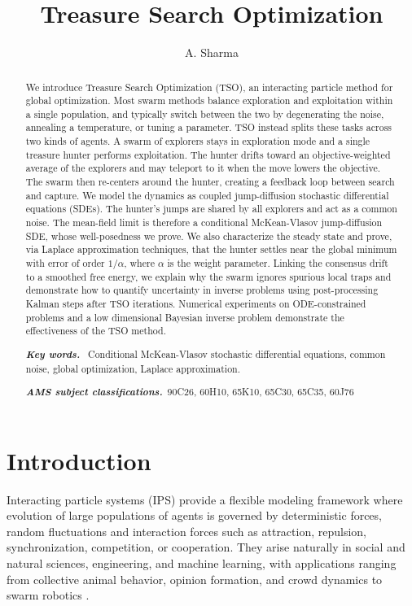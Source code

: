 \documentclass{article}
\title{Treasure Search Optimization}
\author{A. Sharma}
\date{}
\numberwithin{equation}{section}
\providecommand{\keywords}[1]{%
  {\small\noindent\textbf{\textit{Key words.}}\ #1}%
}
\providecommand{\msc}[1]{%
  {\small\noindent\textbf{\textit{AMS subject classifications.}}\ #1}%
}
\begin{document}
\maketitle
\begin{abstract}

We introduce Treasure Search Optimization (TSO), an interacting particle method for global optimization. Most swarm methods balance exploration and exploitation within a single population, and typically switch between the two by degenerating the noise, annealing a temperature, or tuning a parameter. TSO instead splits these tasks across two kinds of agents. A swarm of explorers stays in exploration mode and a single treasure hunter performs exploitation. The hunter drifts toward an objective-weighted average of the explorers and may teleport to it when the move lowers the objective. The swarm then re-centers around the hunter, creating a feedback loop between search and capture. We model the dynamics as coupled jump-diffusion stochastic differential equations (SDEs). The hunter's jumps are shared by all explorers and act as a common noise. The mean-field limit is therefore a conditional McKean-Vlasov jump-diffusion SDE, whose well-posedness we prove. We also characterize the steady state and prove, via Laplace approximation techniques, that the hunter settles near the global minimum with error of order $1/\alpha$, where $\alpha$ is the weight parameter. Linking the consensus drift to a smoothed free energy, we explain why the swarm ignores spurious local traps and demonstrate how to quantify uncertainty in inverse problems using post-processing Kalman steps after TSO iterations. Numerical experiments on ODE-constrained problems and a low dimensional Bayesian inverse problem demonstrate the effectiveness of the TSO method.

\keywords{
Conditional McKean-Vlasov stochastic differential equations, common noise, global optimization, Laplace approximation.
}


\msc{90C26, 60H10, 65K10, 65C30, 65C35, 60J76
}

\end{abstract}


\section{Introduction}

Interacting particle systems (IPS) provide a flexible modeling framework where  evolution of large populations of agents is governed by deterministic forces, random fluctuations and interaction forces such as attraction, repulsion, synchronization, competition, or cooperation. They arise naturally in social and natural sciences, engineering, and machine learning, with applications ranging from collective animal behavior, opinion formation, and crowd dynamics to swarm robotics \cite{albi2019vehicular,SY_Tadmor_flocking,bartel2026multi, bellomo2017quest, motsch_tadmor, ant_colony, handbook_evo_comp}.
\end{document}
